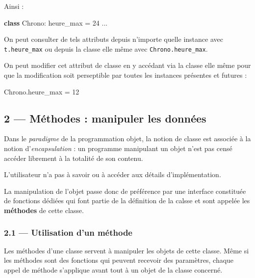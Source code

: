 \documentclass[a4paper,17pt]{extarticle}
\newenvironment{Shaded}{}{}
\newcommand{\KeywordTok}[1]{\textcolor[rgb]{0.00,0.44,0.13}{\textbf{{#1}}}}
\newcommand{\DecValTok}[1]{\textcolor[rgb]{0.25,0.63,0.44}{{#1}}}
\newcommand{\NormalTok}[1]{{#1}}
\newcommand{\OperatorTok}[1]{\textcolor[rgb]{0.40,0.40,0.40}{{#1}}}
\begin{document}
    Ainsi :

\begin{Shaded}
\begin{Highlighting}[]
\KeywordTok{class}\NormalTok{ Chrono:}
\NormalTok{    heure\_max }\OperatorTok{=} \DecValTok{24}
\NormalTok{    ...}
\end{Highlighting}
\end{Shaded}

On peut consulter de tels attributs depuis n'importe quelle instance
avec \texttt{t.heure\_max} ou depuis la classe elle même avec
\texttt{Chrono.heure\_max}.

On peut modifier cet attribut de classe en y accédant via la classe elle
même pour que la modification soit perseptible par toutes les instances
présentes et futures :

\begin{Shaded}
\begin{Highlighting}[]
\NormalTok{Chrono.heure\_max }\OperatorTok{=} \DecValTok{12}
\end{Highlighting}
\end{Shaded}

    \hypertarget{muxe9thodes-manipuler-les-donnuxe9es}{%
\subsection{2 --- Méthodes : manipuler les
données}\label{muxe9thodes-manipuler-les-donnuxe9es}}

    Dans le \emph{paradigme} de la programmation objet, la notion de classe
est associée à la notion d'\emph{encapsulation} : un programme
manipulant un objet n'est pas censé accéder librement à la totalité de
son contenu.

L'utilisateur n'a pas à savoir ou à accéder aux détails
d'implémentation.

La manipulation de l'objet passe donc de préférence par une interface
constituée de fonctions dédiées qui font partie de la définition de la
calsse et sont appelée les \textbf{méthodes} de cette classe.

    \hypertarget{utilisation-dun-muxe9thode}{%
\subsubsection{2.1 --- Utilisation d'un
méthode}\label{utilisation-dun-muxe9thode}}

    Les méthodes d'une classe servent à manipuler les objets de cette
classe. Même si les méthodes sont des fonctions qui peuvent recevoir des
paramètres, chaque appel de méthode s'applique avant tout à un objet de
la classe concerné.
\end{document}
